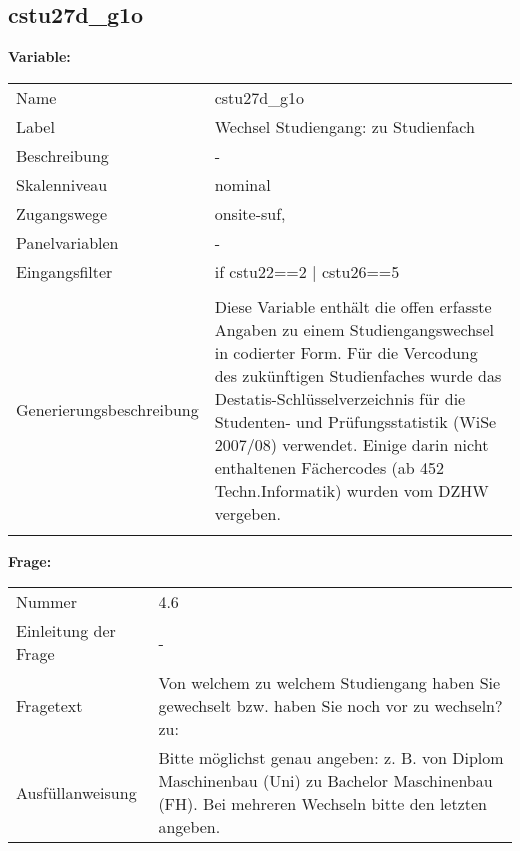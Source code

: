 	
	
	\subsection{cstu27d\_g1o}
	\label{subSection:cstu27d_g1o}

	\noindent\textbf{Variable:}\\
		\begin{tabular}{lL{11.3cm}}
			\label{tableVariable:cstu27d_g1o}
			Name & cstu27d\_g1o \\
			Label & Wechsel Studiengang: zu Studienfach \\
			Beschreibung & - \\
			Skalenniveau & nominal \\
			Zugangswege &
				onsite-suf,
 \\
			Panelvariablen & -
			 \\
			Eingangsfilter & if cstu22==2 | cstu26==5 \\
 \\
					Generierungsbeschreibung & Diese Variable enthält die offen erfasste Angaben zu einem Studiengangswechsel in codierter Form. Für die Vercodung des zukünftigen Studienfaches wurde das Destatis-Schlüsselverzeichnis für die Studenten- und Prüfungsstatistik (WiSe 2007/08) verwendet. Einige darin nicht enthaltenen Fächercodes (ab 452 Techn.Informatik) wurden vom DZHW vergeben.
				 \\	
			 \\
		\end{tabular}

		\vspace*{1 cm}
		\noindent\textbf{Frage:}\\
		\begin{tabular}{lL{11.3cm}}
			\label{tableQuestion:cstu27d_g1o}
			Nummer & 4.6 \\
			Einleitung der Frage & - \\
			Fragetext & Von welchem zu welchem Studiengang haben Sie gewechselt bzw. haben Sie noch vor zu wechseln?
zu: \\
			Ausfüllanweisung & Bitte möglichst genau angeben: z. B. von Diplom Maschinenbau
(Uni) zu Bachelor Maschinenbau (FH).
Bei mehreren Wechseln bitte den letzten angeben. \\
		\end{tabular}





